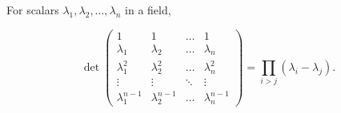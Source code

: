 For scalars $\lambda_1, \lambda_2, \dots, \lambda_n$ in a field,

$$\det \begin{pmatrix}
1 & 1 & \ldots & 1 \\
\lambda_1 & \lambda_2 & \ldots & \lambda_n \\
\lambda_1^2 & \lambda_2^2 & \ldots & \lambda_n^2 \\
\vdots & \vdots & \ddots & \vdots \\
\lambda_1^{n-1} & \lambda_2^{n-1} & \ldots & \lambda_n^{n-1}
\end{pmatrix} = \prod_{i > j} (\lambda_i - \lambda_j).$$
